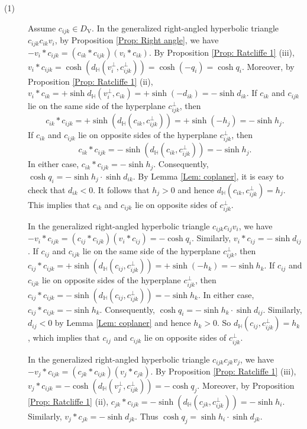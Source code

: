 \documentclass[12pt]{amsart}
\theoremstyle{definition}
\begin{document}
\begin{description}
\item[(1)] Assume $c_{ijk}\in D_\mathrm{V}$.
In the generalized right-angled hyperbolic triangle $c_{ijk}c_{ik}v_i$,
by Proposition \ref{Prop: Right angle},
we have $-v_i\ast c_{ijk}=(c_{ik}\ast c_{ijk})(v_i\ast c_{ik})$.
By Proposition \ref{Prop: Ratcliffe 1} (iii),
$v_i\ast c_{ijk}
=\cosh(d_\mathbb{H}(v_i^\bot,c_{ijk}^\bot))
=\cosh(-q_i)=\cosh q_i$.
Moreover, by Proposition \ref{Prop: Ratcliffe 1} (ii),
$v_i\ast c_{ik}=+\sinh d_\mathbb{H}(v_i^\bot,c_{ik})=+\sinh(-d_{ik})=-\sinh d_{ik}$.
If $c_{ik}$ and $c_{ijk}$ lie on the same side of the hyperplane $c_{ijk}^\bot$,
then
\begin{equation*}
c_{ik}\ast c_{ijk}=+\sinh(d_\mathbb{H}(c_{ik},c_{ijk}^\bot))
=+\sinh(-h_j)=-\sinh h_j.
\end{equation*}
If $c_{ik}$ and $c_{ijk}$ lie on opposite sides of the hyperplane $c_{ijk}^\bot$,
then
\begin{equation*}
c_{ik}\ast c_{ijk}=-\sinh(d_\mathbb{H}(c_{ik},c_{ijk}^\bot))
=-\sinh h_j.
\end{equation*}
In either case, $c_{ik}\ast c_{ijk}=-\sinh h_j$.
Consequently, $\cosh q_i=-\sinh h_j\cdot\sinh d_{ik}$.
By Lemma \ref{Lem: coplaner}, it is easy to check that $d_{ik}<0$.
It follows that $h_j>0$ and hence $d_\mathbb{H}(c_{ik},c_{ijk}^\bot)=h_j$.
This implies that $c_{ik}$ and $c_{ijk}$ lie on opposite sides of $c_{ijk}^\bot$.

In the generalized right-angled hyperbolic triangle $c_{ijk}c_{ij}v_i$,
we have $-v_i\ast c_{ijk}=(c_{ij}\ast c_{ijk})(v_i\ast c_{ij})=-\cosh q_i$.
Similarly, $v_i\ast c_{ij}=-\sinh d_{ij}$.
If $c_{ij}$ and $c_{ijk}$ lie on the same side of the hyperplane $c_{ijk}^\bot$,
then $c_{ij}\ast c_{ijk}=+\sinh(d_\mathbb{H}(c_{ij},c_{ijk}^\bot))
=+\sinh(-h_k)=-\sinh h_k$.
If $c_{ij}$ and $c_{ijk}$ lie on opposite sides of the hyperplane $c_{ijk}^\bot$, then $c_{ij}\ast c_{ijk}=-\sinh(d_\mathbb{H}(c_{ij},c_{ijk}^\bot))
=-\sinh h_k$.
In either case, $c_{ij}\ast c_{ijk}=-\sinh h_k$.
Consequently, $\cosh q_i=-\sinh h_k\cdot\sinh d_{ij}$.
Similarly, $d_{ij}<0$ by Lemma \ref{Lem: coplaner} and hence $h_k>0$.
So $d_\mathbb{H}(c_{ij},c_{ijk}^\bot)=h_k$,
which implies that $c_{ij}$ and $c_{ijk}$ lie on opposite sides of $c_{ijk}^\bot$.

In the generalized right-angled hyperbolic triangle $c_{ijk}c_{jk}v_j$,
we have $-v_j\ast c_{ijk}=(c_{jk}\ast c_{ijk})(v_j\ast c_{jk})$.
By Proposition \ref{Prop: Ratcliffe 1} (iii),
$v_j\ast c_{ijk}
=-\cosh(d_\mathbb{H}(v_j^\bot,c_{ijk}^\bot))=-\cosh q_j$.
Moreover, by Proposition \ref{Prop: Ratcliffe 1} (ii),
$c_{jk}\ast c_{ijk}=-\sinh (d_\mathbb{H}(c_{jk},c_{ijk}^\bot))=-\sinh h_i$.
Similarly, $v_j\ast c_{jk}=-\sinh d_{jk}$.
Thus $\cosh q_j=\sinh h_i\cdot \sinh d_{jk}$.


\end{description}
\end{document}
